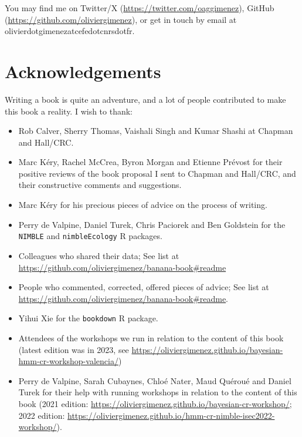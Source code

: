 \documentclass[
  12pt,
]{krantz}
\providecommand{\tightlist}{%
  \setlength{\itemsep}{0pt}\setlength{\parskip}{0pt}}
\begin{document}
You may find me on Twitter/X (\url{https://twitter.com/oaggimenez}), GitHub (\url{https://github.com/oliviergimenez}), or get in touch by email at olivier\textbar dot\textbar gimenez\textbar at\textbar cefe\textbar dot\textbar cnrs\textbar dot\textbar fr.

\section*{Acknowledgements}\label{acknowledgements}


Writing a book is quite an adventure, and a lot of people contributed to make this book a reality. I wish to thank:

\begin{itemize}
\tightlist
\item
  Rob Calver, Sherry Thomas, Vaishali Singh and Kumar Shashi at Chapman and Hall/CRC.\\
\item
  Marc Kéry, Rachel McCrea, Byron Morgan and Etienne Prévost for their positive reviews of the book proposal I sent to Chapman and Hall/CRC, and their constructive comments and suggestions.\\
\item
  Marc Kéry for his precious pieces of advice on the process of writing.\\
\item
  Perry de Valpine, Daniel Turek, Chris Paciorek and Ben Goldstein for the \texttt{NIMBLE} and \texttt{nimbleEcology} R packages.\\
\item
  Colleagues who shared their data; See list at \url{https://github.com/oliviergimenez/banana-book\#readme}
\item
  People who commented, corrected, offered pieces of advice; See list at \url{https://github.com/oliviergimenez/banana-book\#readme}.
\item
  Yihui Xie for the \texttt{bookdown} R package.
\item
  Attendees of the workshops we run in relation to the content of this book (latest edition was in 2023, see \url{https://oliviergimenez.github.io/bayesian-hmm-cr-workshop-valencia/})
\item
  Perry de Valpine, Sarah Cubaynes, Chloé Nater, Maud Quéroué and Daniel Turek for their help with running workshops in relation to the content of this book (2021 edition: \url{https://oliviergimenez.github.io/bayesian-cr-workshop/}; 2022 edition: \url{https://oliviergimenez.github.io/hmm-cr-nimble-isec2022-workshop/}).\\

\end{itemize}
\end{document}
